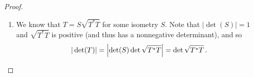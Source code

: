\documentclass[11pt]{amsart}
\begin{document}
\begin{enumerate}[(1)]
\begin{proof}
\begin{enumerate}
\item We know that $T = S \sqrt{ T^* T }$ for some isometry $S$.
Note that $|\det(S)| = 1$ and $\sqrt{ T^* T }$ is positive (and thus has a nonnegative determinant), and so
\[
  |\det(T)|
  = \left| \det(S) \det \sqrt{ T^* T } \right|
  = \det \sqrt{ T^* T } \, . \qedhere
\]

\end{enumerate}
\end{proof}

\end{enumerate}
\end{document}
